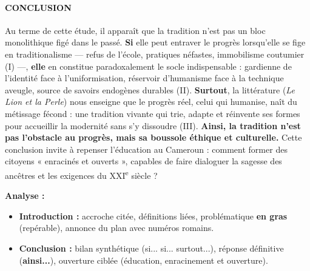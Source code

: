 \documentclass[11pt]{article}
\begin{document}
\begin{exoresolu}
\paragraph{CONCLUSION}
Au terme de cette étude, il apparaît que la tradition n'est pas un bloc monolithique figé dans le passé. \textbf{Si} elle peut entraver le progrès lorsqu'elle se fige en traditionalisme — refus de l'école, pratiques néfastes, immobilisme coutumier (I) —, \textbf{elle} en constitue paradoxalement le socle indispensable : gardienne de l'identité face à l'uniformisation, réservoir d'humanisme face à la technique aveugle, source de savoirs endogènes durables (II). \textbf{Surtout}, la littérature (\emph{Le Lion et la Perle}) nous enseigne que le progrès réel, celui qui humanise, naît du métissage fécond : une tradition vivante qui trie, adapte et réinvente ses formes pour accueillir la modernité sans s'y dissoudre (III). \textbf{Ainsi, la tradition n'est pas l'obstacle au progrès, mais sa boussole éthique et culturelle.} Cette conclusion invite à repenser l'éducation au Cameroun : comment former des citoyens « enracinés et ouverts », capables de faire dialoguer la sagesse des ancêtres et les exigences du XXI\textsuperscript{e} siècle ?

\textbf{Analyse :}
\begin{itemize}
    \item \textbf{Introduction :} accroche citée, définitions liées, problématique \textbf{en gras} (repérable), annonce du plan avec numéros romains.
    \item \textbf{Conclusion :} bilan synthétique (si... si... surtout...), réponse définitive (\textbf{ainsi...}), ouverture ciblée (éducation, enracinement et ouverture).
\end{itemize}
\end{exoresolu}
\end{document}

